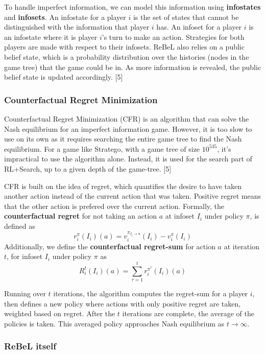 \documentclass{article}
\begin{document}
To handle imperfect information, we can model this information using \textbf{infostates} and \textbf{infosets}. An infostate for a player $i$ is the set of states that cannot be distinguished with the information that player $i$ has. 
An infoset for a player $i$ is an infostate where it is player $i$’s turn to make an action. Strategies for both players are made with respect to their infosets. 
ReBeL also relies on a public belief state, which is a probability distribution over the histories (nodes in the game tree) that the game could be in. 
As more information is revealed, the public belief state is updated accordingly. [5]

\subsubsection{Counterfactual Regret Minimization}

Counterfactual Regret Minimization (CFR) is an algorithm that can solve the Nash equilibrium for an imperfect information game. However, it is too slow to use on its own as it requires searching the entire game tree to find the Nash equilibrium. 
For a game like Stratego, with a game tree of size $10^{535}$, it’s impractical to use the algorithm alone. Instead, it is used for the search part of RL+Search, up to a given depth of the game-tree. [5]

CFR is built on the idea of regret, which quantifies the desire to have taken another action instead of the current action that was taken. Positive regret means that the other action is prefered over the current action. 
Formally, the \textbf{counterfactual regret} for not taking an action $a$ at infoset $I_i$ under policy $\pi$, is defined as $$ r^{\pi}_i(I_i)(a) = v_i^{\pi_{I_i \rightarrow a}}(I_i) - v_i^{\pi}(I_i) $$ 
Additionally, we define the \textbf{counterfactual regret-sum} for action $a$ at iteration $t$, for infoset $I_i$ under policy $\pi$ as $$ R_i^t(I_i)(a) = \sum_{\tau = 1}^t r_i^{\pi^\tau}(I_i)(a) $$ 

Running over $t$ iterations, the algorithm computes the regret-sum for a player $i$, then defines a new policy where actions with only positive regret are taken, weighted based on regret. 
After the $t$ iterations are complete, the average of the policies is taken. This averaged policy approaches Nash equilibrium as $t \rightarrow \infty$. 

\subsubsection{ReBeL itself}
\end{document}
